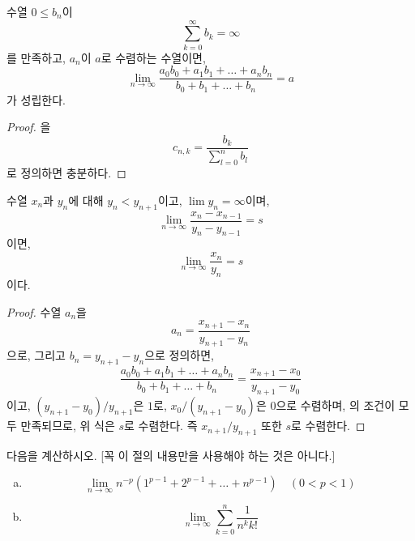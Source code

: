 \begin{lemma}
\label{lem:stoltz}
    수열 $0 \leq b_n$이
    \begin{equation*}
        \sum_{k = 0}^\infty b_k = \infty
    \end{equation*}
    를 만족하고, $a_n$이 $a$로 수렴하는 수열이면,
    \begin{equation*}
        \lim_{n \to \infty} \frac{a_0 b_0 + a_1 b_1 + \dots + a_n b_n}{b_0 + b_1 + \dots + b_n} = a
    \end{equation*}
    가 성립한다.
\end{lemma}
\begin{proof}
    을
    \begin{equation*}
        c_{n, k} = \frac{b_k}{\sum_{l = 0}^n b_l}
    \end{equation*}
    로 정의하면 충분하다.
\end{proof}
\begin{theorem}[Stoltz]
\label{thm:stoltz}  
    수열 $x_n$과 $y_n$에 대해 $y_n < y_{n + 1}$이고, $\lim y_n = \infty$이며,
    \begin{equation*}
        \lim_{n \to \infty} \frac{x_n - x_{n - 1} }{y_n - y_{n - 1}} = s
    \end{equation*}
    이면,
    \begin{equation*}
        \lim_{n \to \infty} \frac{x_n}{y_n} = s
    \end{equation*}
    이다.
\end{theorem}
\begin{proof}
    수열 $a_n$을
    \begin{equation*}
        a_n = \frac{x_{n + 1} - x_n}{y_{n + 1} - y_n}
    \end{equation*}
    으로, 그리고 $b_n = y_{n + 1} - y_n$으로 정의하면,
    \begin{equation*}
        \frac{a_0 b_0 + a_1 b_1 + \dots + a_n b_n}{b_0 + b_1 + \dots + b_n} = \frac{x_{n + 1} - x_0}{y_{n + 1} - y_0}
    \end{equation*}
    이고, $(y_{n + 1} - y_0)/y_{n + 1}$은 $1$로, $x_0/(y_{n + 1} - y_0)$은 $0$으로 수렴하며, 의 조건이 모두 만족되므로, 위 식은 $s$로 수렴한다.
    즉 $x_{n + 1}/y_{n + 1}$ 또한 $s$로 수렴한다.
\end{proof}

\begin{exercise}
    다음을 계산하시오. [꼭 이 절의 내용만을 사용해야 하는 것은 아니다.]
    \begin{enumerate}[(a)]
        \item \begin{equation*}
            \lim_{n \to \infty} n^{-p} (1^{p - 1} + 2^{p - 1} + \dots + n^{p - 1}) \quad (0 < p < 1)
        \end{equation*}
        \item \begin{equation*}
            \lim_{n \to \infty} \sum_{k = 0}^n \frac{1}{n^k k!}
        \end{equation*}
    \end{enumerate}
\end{exercise}


